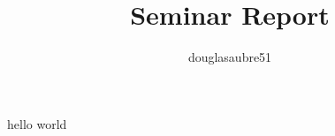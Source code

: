 \documentclass{article}
\title{
    Seminar Report
}
\author{
    douglasaubre51
}
\begin{document}
\maketitle
{}

\newpage
{}
hello world
\end{document}
